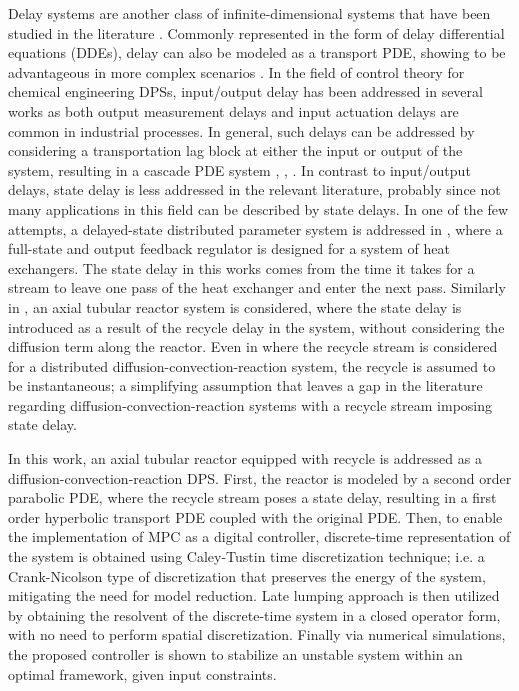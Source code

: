 Delay systems are another class of infinite-dimensional systems that have been studied in the literature \cite{curtainbook}. 
Commonly represented in the form of delay differential equations (DDEs), delay can also be modeled as a transport PDE, showing to be advantageous in more complex scenarios \cite{krstic2009book}. In the field of control theory for chemical engineering DPSs, input/output delay has been addressed in several works as both output measurement delays and input actuation delays are common in industrial processes. 
In general, such delays can be addressed by considering a transportation lag block at either the input or output of the system, resulting in a cascade PDE system \cite{Hiratsuka1969IEEE}, \cite{mohammadi2012lq}, \cite{Guilherme2019ACC}. In contrast to input/output delays, state delay is less addressed in the relevant literature, probably since not many applications in this field can be described by state delays. In one of the few attempts, a delayed-state distributed parameter system is addressed in \cite{ozorio2019heat}, where a full-state and output feedback regulator is designed for a system of heat exchangers. The state delay in this works comes from the time it takes for a stream to leave one pass of the heat exchanger and enter the next pass. Similarly in \cite{qi2021output}, an axial tubular reactor system is considered, where the state delay is introduced as a result of the recycle delay in the system, without considering the diffusion term along the reactor. Even in \cite{khatibi2021model} where the recycle stream is considered for a distributed diffusion-convection-reaction system, the recycle is assumed to be instantaneous; a simplifying assumption that leaves a gap in the literature regarding diffusion-convection-reaction systems with a recycle stream imposing state delay.

In this work, an axial tubular reactor equipped with recycle is addressed as a diffusion-convection-reaction DPS. First, the reactor is modeled by a second order parabolic PDE, where the recycle stream poses a state delay, resulting in a first order hyperbolic transport PDE coupled with the original PDE. Then, to enable the implementation of MPC as a digital controller, discrete-time representation of the system is obtained using Caley-Tustin time discretization technique; i.e. a Crank-Nicolson type of discretization that preserves the energy of the system, mitigating the need for model reduction. Late lumping approach is then utilized by obtaining the resolvent of the discrete-time system in a closed operator form, with no need to perform spatial discretization. Finally via numerical simulations, the proposed controller is shown to stabilize an unstable system within an optimal framework, given input constraints.